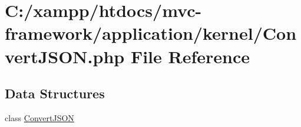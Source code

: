 \hypertarget{_convert_j_s_o_n_8php}{}\section{C\+:/xampp/htdocs/mvc-\/framework/application/kernel/\+Convert\+J\+S\+ON.php File Reference}
\label{_convert_j_s_o_n_8php}
\subsection*{Data Structures}
\begin{DoxyCompactItemize}
\item 
class \hyperlink{class_convert_j_s_o_n}{Convert\+J\+S\+ON}
\end{DoxyCompactItemize}
